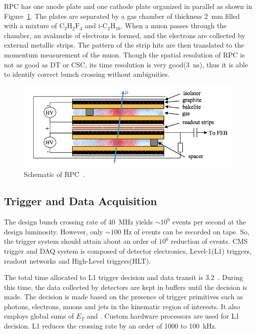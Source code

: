 RPC has one anode plate and one cathode plate organized in parallel
as shown in Figure~\ref{fig:muon_rpc}. 
The plates are separated by a gas chamber of thickness 2~mm 
filled with a mixture of $\textrm{C}_2\textrm{H}_2\textrm{F}_4$ 
and $\textrm{i-C}_2 \textrm{H}_{10}$.
When a muon passes through the chamber, an avalanche of electrons is formed, 
and the electrons are collected by external metallic strips. 
The pattern of the strip hits are then translated to the momentum measurement
of the muon. Though the spatial resolution of RPC is not as good as DT or CSC,
its time resolution is very good(3~ns), thus it is able to identify 
correct bunch crossing without ambiguities. 
%
\begin{figure}[h] 
\centering
\vspace{1cm}
\includegraphics[width=0.99\textwidth]{figures/rpc.png}
\caption{Schematic of RPC~\cite{Lenzi:2013xpa}.}
\label{fig:muon_rpc} 
\end{figure} 


\subsection{Trigger and Data Acquisition} 

The design bunch crossing rate of 40~MHz yields $\sim 10^9$ events per second
at the design luminosity. However, only $\sim 100$ Hz of events can be recorded 
on tape. So, the trigger system should attain about an order of $10^6$ 
reduction of events. CMS trigger and DAQ system is composed of 
detector electronics, Level-1(L1) triggers, readout networks and 
High-Level triggers(HLT). 

The total time allocated to L1 trigger decision and data transit is 3.2~\um.
During this time, the data collected by detectors are kept in buffers 
until the decision is made. The decision is made based on the presence 
of trigger primitives such as photons, electrons, muons and jets 
in the kinematic region of interests. It also employs global sums 
of $E_T$ and \met. Custom hardware processors are used for L1 decision.  
L1 reduces the crossing rate by an order of 1000 to 100~kHz.  

